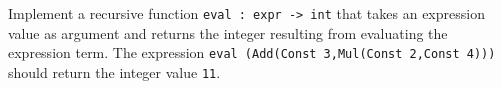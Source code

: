 Implement a recursive function \lstinline{eval : expr -> int} that takes an
expression value as argument and returns the integer resulting from
evaluating the expression term. The expression \lstinline{eval (Add(Const 3,Mul(Const 2,Const 4)))} should return the integer value \lstinline{11}.
